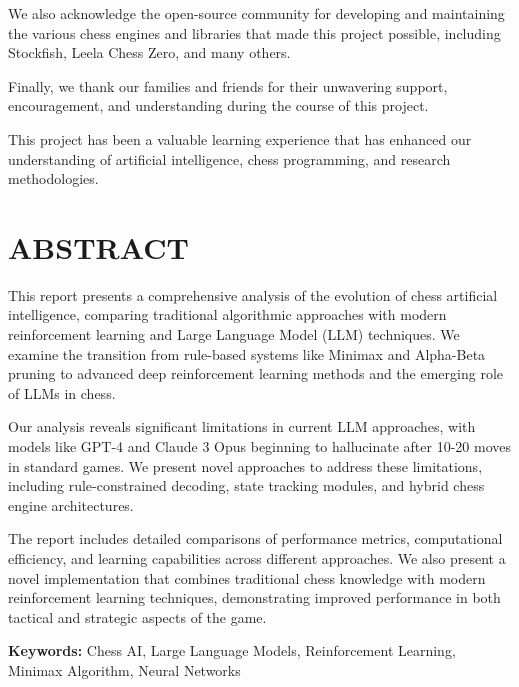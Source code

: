 \documentclass[12pt,a4paper]{report}
\begin{document}
We also acknowledge the open-source community for developing and maintaining the various chess engines and libraries that made this project possible, including Stockfish, Leela Chess Zero, and many others.

Finally, we thank our families and friends for their unwavering support, encouragement, and understanding during the course of this project.

This project has been a valuable learning experience that has enhanced our understanding of artificial intelligence, chess programming, and research methodologies.

\newpage

\chapter*{ABSTRACT}

This report presents a comprehensive analysis of the evolution of chess artificial intelligence, comparing traditional algorithmic approaches with modern reinforcement learning and Large Language Model (LLM) techniques. We examine the transition from rule-based systems like Minimax and Alpha-Beta pruning to advanced deep reinforcement learning methods and the emerging role of LLMs in chess.

Our analysis reveals significant limitations in current LLM approaches, with models like GPT-4 and Claude 3 Opus beginning to hallucinate after 10-20 moves in standard games. We present novel approaches to address these limitations, including rule-constrained decoding, state tracking modules, and hybrid chess engine architectures.

The report includes detailed comparisons of performance metrics, computational efficiency, and learning capabilities across different approaches. We also present a novel implementation that combines traditional chess knowledge with modern reinforcement learning techniques, demonstrating improved performance in both tactical and strategic aspects of the game.

\textbf{Keywords:} Chess AI, Large Language Models, Reinforcement Learning, Minimax Algorithm, Neural Networks

\newpage

\tableofcontents
\newpage

\listoffigures
\newpage

\listoftables
\newpage
\end{document}
